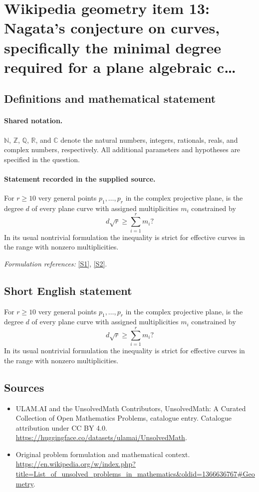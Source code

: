 \documentclass[11pt]{article}
\newcommand{\sref}[2]{\hyperlink{source:#1:#2}{[S#2]}}
\begin{document}
\section{Wikipedia geometry item 13: Nagata's conjecture on curves, specifically the minimal degree required for a plane algebraic c…}\label{statement}

\subsection{Definitions and mathematical statement}

\paragraph{Shared notation.}$\mathbb N$, $\mathbb Z$, $\mathbb Q$, $\mathbb R$, and $\mathbb C$ denote the natural numbers, integers, rationals, reals, and complex numbers, respectively. All additional parameters and hypotheses are specified in the question.


\paragraph{Statement recorded in the supplied source.}
For $r\geq10$ very general points $p_1,\ldots,p_r$ in the complex projective plane, is the degree $d$ of every plane curve with assigned multiplicities $m_i$ constrained by
\[d\sqrt r\geq\sum_{i=1}^rm_i?\]
In its usual nontrivial formulation the inequality is strict for effective curves in the range with nonzero multiplicities.
\par\smallskip\textit{Formulation references:} \sref{statement}{1}, \sref{statement}{2}.
\subsection{Short English statement}
For $r\geq10$ very general points $p_1,\ldots,p_r$ in the complex projective plane, is the degree $d$ of every plane curve with assigned multiplicities $m_i$ constrained by
\[d\sqrt r\geq\sum_{i=1}^rm_i?\]
In its usual nontrivial formulation the inequality is strict for effective curves in the range with nonzero multiplicities.
\subsection{Sources}
\begin{itemize}
\item[\hypertarget{source:statement:1}{S1}] ULAM.AI and the UnsolvedMath Contributors, UnsolvedMath: A Curated Collection of Open Mathematics Problems, catalogue entry. Catalogue attribution under CC BY 4.0.
\url{https://huggingface.co/datasets/ulamai/UnsolvedMath}.
\item[\hypertarget{source:statement:2}{S2}] Original problem formulation and mathematical context.
\url{https://en.wikipedia.org/w/index.php?title=List_of_unsolved_problems_in_mathematics&oldid=1366636767#Geometry}.
\end{itemize}
\label{end:statement}
\end{document}
